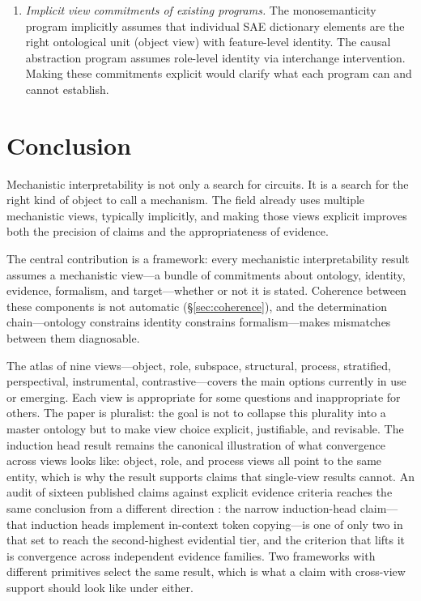 \documentclass{article}
\begin{document}
\begin{enumerate}[leftmargin=*]
      safety-relevant inference?  The object view is likely insufficient---a
      head identified as safety-relevant on one distribution may not
      generalize.  The structural or stratified views may be necessary, but
      their evidential demands are currently impractical at scale.
\item \emph{Implicit view commitments of existing programs.}  The
      monosemanticity program \citep{bricken2023,templeton2024} implicitly
      assumes that individual SAE dictionary elements are the right ontological
      unit (object view) with feature-level identity.  The causal abstraction
      program \citep{geiger2021,geiger2024} assumes role-level identity via
      interchange intervention.  Making these commitments explicit would
      clarify what each program can and cannot establish.
\end{enumerate}

\section{Conclusion}

Mechanistic interpretability is not only a search for circuits.  It is
a search for the right kind of object to call a mechanism.  The field
already uses multiple mechanistic views, typically implicitly, and making
those views explicit improves both the precision of claims and the
appropriateness of evidence.

The central contribution is a framework: every mechanistic
interpretability result assumes a mechanistic view---a bundle of
commitments about ontology, identity, evidence, formalism, and
target---whether or not it is stated.  Coherence between these
components is not automatic (\S\ref{sec:coherence}), and the
determination chain---ontology constrains identity constrains
formalism---makes mismatches between them diagnosable.

The atlas of nine views---object, role, subspace, structural, process,
stratified, perspectival, instrumental, contrastive---covers the main
options currently in use or emerging.  Each view is appropriate for some
questions and inappropriate for others.  The paper is pluralist: the
goal is not to collapse this plurality into a master ontology but to
make view choice explicit, justifiable, and revisable.  The induction
head result remains the canonical illustration of what convergence
across views looks like: object, role, and process views all point to
the same entity, which is why the result supports claims that
single-view results cannot.  An audit of sixteen published claims against
explicit evidence criteria reaches the same conclusion from a different
direction \citep{tower2026mechvalidity}: the narrow induction-head
claim---that induction heads implement in-context token copying---is one
of only two in that set to reach the second-highest evidential tier, and
the criterion that lifts it is convergence across independent evidence
families.  Two frameworks with different primitives select the same
result, which is what a claim with cross-view support should look like
under either.
\end{document}
